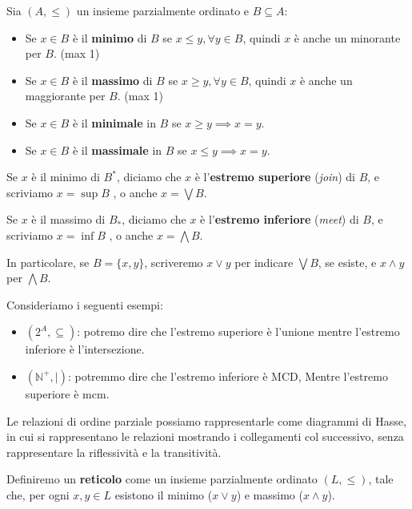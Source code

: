 \begin{definizione}
    Sia $(A,\leq)$ un insieme parzialmente ordinato e $B \subseteq A$:
    \begin{itemize}
        \item Se $x \in B$ è il \textbf{minimo} di $B$ se $x \leq y, \forall y
                  \in B$, quindi $x$ è anche un minorante per $B$. (max 1)
        \item Se $x \in B$ è il \textbf{massimo} di $B$ se $x \geq y,\forall y
                  \in B$, quindi $x$ è anche un maggiorante per $B$. (max 1)
        \item Se $x \in B$ è il \textbf{minimale} in $B$ se $x \geq y \implies
                  x = y$.
        \item Se $x \in B$ è il \textbf{massimale} in $B$ se $x \leq y \implies
                  x = y$.
    \end{itemize}
\end{definizione}
\begin{definizione}
    Se $x$ è il minimo di $B^\ast$, diciamo che $x$ è l'\textbf{estremo superiore}
    (\textit{join}) di $B$, e scriviamo $x = \sup B$ , o anche $x = \bigvee B$.

    Se $x$ è il massimo di $B_\ast$, diciamo che $x$ è l'\textbf{estremo inferiore}
    (\textit{meet}) di $B$, e scriviamo $x = \inf B$ , o anche $x = \bigwedge B$.

    In particolare, se $B = \{x, y\}$, scriveremo $x \lor y$ per indicare $\bigvee
        B$, se esiste, e $x \land y$ per $\bigwedge B$.
\end{definizione}
\begin{esempio}
    Consideriamo i seguenti esempi:
    \begin{itemize}
        \item $(2^A, \subseteq)$: potremo dire che l'estremo superiore è l'unione
              mentre l'estremo inferiore è l'intersezione.
        \item $(\mathbb{N}^+,|)$: potremmo dire che l'estremo inferiore è MCD, Mentre
              l'estremo superiore è mcm.
    \end{itemize}
\end{esempio}
Le relazioni di ordine parziale possiamo rappresentarle come diagrammi di Hasse,
in cui si rappresentano le relazioni mostrando i collegamenti col successivo, 
senza rappresentare la riflessività e la transitività.
\begin{definizione}
    Definiremo un \textbf{reticolo} come un insieme parzialmente ordinato $(L,
        \leq)$, tale che, per ogni $x,y\in L$ esistono il minimo ($x \lor y$) e
    massimo ($x \land y$).
\end{definizione}
